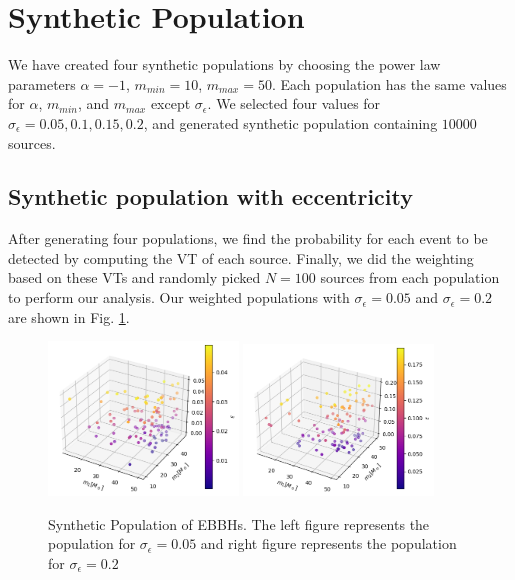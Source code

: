 \documentclass[twocolumn,prd,nofootinbib]{revtex4}
\begin{document}
\section{Synthetic Population}
\label{sec:syn_pop}
We have created four synthetic populations by choosing the power law parameters $\alpha = -1$, $m_{min} = 10$, $m_{max}=50$. Each population has the same values for $\alpha$, $m_{min}$, and $m_{max}$ except $\sigma_\epsilon$. We selected four values for $\sigma_\epsilon = 0.05, 0.1, 0.15, 0.2$, and  generated synthetic population containing $10000$ sources.

\subsection{Synthetic population with eccentricity}

After generating four populations, we find the probability for each event to be detected by computing the VT of each source. Finally, we did the weighting based on these VTs and randomly picked $N=100$ sources from each population to perform our analysis. Our weighted populations with $\sigma_\epsilon=0.05$ and $\sigma_\epsilon=0.2$ are shown in Fig. \ref{fig:pop3d0.05_0.2}.

\begin{figure}[]
\includegraphics[width=0.45\textwidth]{paper/figures/pop3d_0.05.png}
\includegraphics[width=0.45\textwidth]{paper/figures/pop3d_0.2.png}
\caption{\label{fig:pop3d0.05_0.2} Synthetic Population of EBBHs. The left figure represents the population for $\sigma_\epsilon=0.05$ and right figure represents the population for $\sigma_\epsilon=0.2$}
\end{figure}
\end{document}
